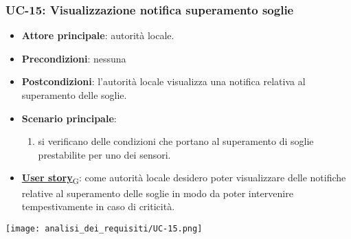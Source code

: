\subsubsection{UC-15: Visualizzazione notifica superamento soglie}
\begin{itemize}
	\item \textbf{Attore principale}: autorità locale.
	\item \textbf{Precondizioni}: nessuna
	\item \textbf{Postcondizioni}: l'autorità locale visualizza una notifica relativa al superamento delle soglie.
	\item \textbf{Scenario principale}:
	      \begin{enumerate}
		      \item si verificano delle condizioni che portano al superamento di soglie prestabilite per uno dei sensori.
	      \end{enumerate}
	\item \href{https://7last.github.io/docs/pb/documentazione-interna/glossario\#user-story}{\textbf{User story}\textsubscript{G}}:
	      come autorità locale desidero poter visualizzare delle notifiche relative al superamento delle soglie in modo da poter intervenire tempestivamente in caso di criticità.
\end{itemize}
\begin{center}
	\texttt{[image: analisi\_dei\_requisiti/UC-15.png]}
\end{center}

